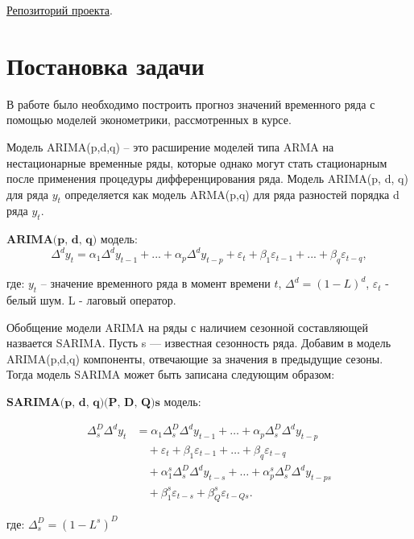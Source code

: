 \documentclass[]{article}
\begin{document}
{
	\Large
	\href{https://github.com/MaximKiryakin/Vega/tree/FinanceEconometrics/Project1}{Репозиторий проекта}.
}

\section{Постановка задачи}

В работе было необходимо построить прогноз значений временного ряда с помощью моделей эконометрики, рассмотренных в курсе.

Модель ARIMA(p,d,q) -- это расширение моделей типа ARMA на нестационарные временные ряды, которые однако могут стать стационарным после применения процедуры дифференцирования ряда. Модель ARIMA(p, d, q) для ряда $y_t$ определяется как модель ARMA(p,q) для ряда разностей порядка d ряда $y_t$.

$\textbf{ARIMA(p, d, q)}$ модель:
\begin{equation*}
	\Delta^d y_t = \alpha_1 \Delta^d y_{t-1} + ... + \alpha_p\Delta^dy_{t-p} + \varepsilon_t + \beta_1\varepsilon_{t-1} + ... + \beta_q\varepsilon_{t-q},
\end{equation*}

где: $y_t$ -- значение временного ряда в момент времени $t$, $\Delta^d = (1 - L)^d$, $\varepsilon_t$ - белый шум. L - лаговый оператор.

Обобщение модели ARIMA на ряды с наличием сезонной составляющей назвается SARIMA. Пусть s — известная сезонность ряда. Добавим в модель ARIMA(p,d,q) компоненты, отвечающие за значения в предыдущие сезоны. Тогда модель SARIMA может быть записана следующим образом:

$\textbf{SARIMA(p, d, q)(P, D, Q)s}$ модель:

\begin{equation*}
	\begin{split}
		\Delta^D_s\Delta^d y_t 
		&= \alpha_1\Delta^D_s \Delta^d y_{t-1} + \dots + \alpha_p\Delta^D_s\Delta^dy_{t-p} \\
		&\quad+ \varepsilon_t + \beta_1\varepsilon_{t-1} + \dots + \beta_q\varepsilon_{t-q} \\
		&\quad+ \alpha_1^s\Delta^D_s \Delta^d y_{t-s} + \dots + \alpha_p^s\Delta^D_s \Delta^d y_{t-ps} \\
		&\quad+ \beta_1^s\varepsilon_{t-s}+\beta_Q^s\varepsilon_{t-Qs}.
	\end{split}
\end{equation*}

где: $\Delta^D_s = (1 - L^s)^D$
\end{document}
